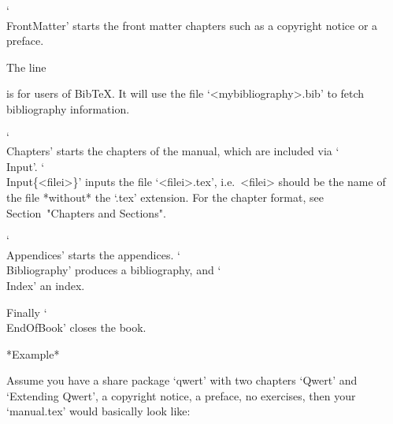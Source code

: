 `\\FrontMatter' starts the front matter  chapters  such  as  a  copyright
notice or a preface.

The line

{}

is for users of Bib{\TeX}. It will use the file `<mybibliography>.bib' to
fetch bibliography information.


`\\Chapters' starts the chapters of the manual, which  are  included  via
`\\Input'.   `\\Input\{<filei>\}'   inputs   the   file    `<filei>.tex',
i.e.~<filei> should  be  the  name  of  the  file  *without*  the  `.tex'
extension. For the chapter format, see Section~"Chapters and Sections".

`\\Appendices'  starts the appendices.
`\\Bibliography'  produces a bibliography, and `\\Index' an index.

Finally `\\EndOfBook' closes the book.

*Example*

Assume you have a share package `qwert' with  two  chapters  `Qwert'  and
`Extending Qwert', a copyright notice, a preface, no exercises, then your
`manual.tex' would basically look like:

\begintt
  \TableOfContents
  \FrontMatter
  \Chapters
  \Appendices
    \Index
\EndOfBook
\endtt

